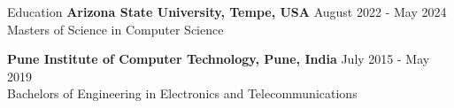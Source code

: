 \documentclass{resume} %
\begin{document}
\begin{rSection}{Education}
                        \textbf{Arizona State University, Tempe, USA} \hfill {August 2022 - May 2024} \\
                            {Masters of Science in Computer Science}
                         
             
         
                        \textbf{Pune Institute of Computer Technology, Pune, India} \hfill {July 2015 - May 2019} \\
                            {Bachelors of Engineering in Electronics and Telecommunications}
                         
             
         
    \end{rSection}
\end{document}
